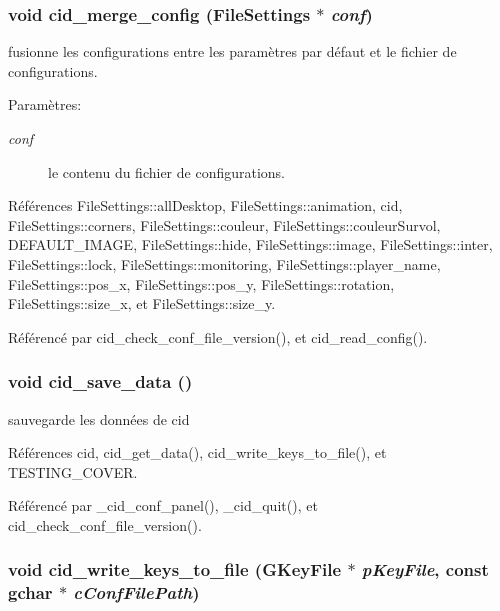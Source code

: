 \subsubsection{\setlength{\rightskip}{0pt plus 5cm}void cid\_\-merge\_\-config ({\bf FileSettings} $\ast$ {\em conf})}\label{cid-config_8h_4f844443b05d6ce433181abd4cc27b22}


fusionne les configurations entre les paramètres par défaut et le fichier de configurations. \begin{Desc}
\item[Paramètres:]
\begin{description}
\item[{\em conf}]le contenu du fichier de configurations. \end{description}
\end{Desc}


Références FileSettings::allDesktop, FileSettings::animation, cid, FileSettings::corners, FileSettings::couleur, FileSettings::couleurSurvol, DEFAULT\_\-IMAGE, FileSettings::hide, FileSettings::image, FileSettings::inter, FileSettings::lock, FileSettings::monitoring, FileSettings::player\_\-name, FileSettings::pos\_\-x, FileSettings::pos\_\-y, FileSettings::rotation, FileSettings::size\_\-x, et FileSettings::size\_\-y.

Référencé par cid\_\-check\_\-conf\_\-file\_\-version(), et cid\_\-read\_\-config().
\subsubsection{\setlength{\rightskip}{0pt plus 5cm}void cid\_\-save\_\-data ()}\label{cid-config_8h_a924ec2e21de1e288a0fb06a7ec71e90}


sauvegarde les données de cid 

Références cid, cid\_\-get\_\-data(), cid\_\-write\_\-keys\_\-to\_\-file(), et TESTING\_\-COVER.

Référencé par \_\-cid\_\-conf\_\-panel(), \_\-cid\_\-quit(), et cid\_\-check\_\-conf\_\-file\_\-version().
\subsubsection{\setlength{\rightskip}{0pt plus 5cm}void cid\_\-write\_\-keys\_\-to\_\-file (GKeyFile $\ast$ {\em pKeyFile}, \/  const gchar $\ast$ {\em cConfFilePath})}\label{cid-config_8h_bde2f6a9c4d72b55999544d4d823d75a}


